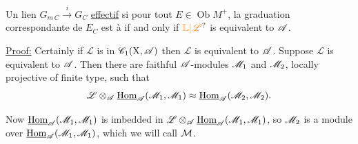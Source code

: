 Un lien $G_{m\,C}\xrightarrow{i}G_C$  \uline{effectif} si pour tout $E\in\operatorname{Ob}M^+$, la graduation correspondante de $E_C$ est à
if and only if $\unsure{\mathbb{L}|\mathscr{L}}$ is equivalent to $\mathscr{A}$.

\uline{Proof:} Certainly if $\mathscr{L}$ is in $\mathscr{C}_1(\mathrm{X},\mathscr{A})$ then $\mathscr{L}$ is equivalent to $\mathscr{A}$. Suppose $\mathscr{L}$ is equivalent to $\mathscr{A}$. Then there are faithful $\mathscr{A}$-modules $\mathscr{M}_1$ and $\mathscr{M}_2$, locally projective of finite type, such that
\[
\mathscr{L}\otimes_{\mathscr{A}}\underline{\mathrm{Hom}}_{\mathscr{A}}(\mathscr{M}_1,\mathscr{M}_1)\approx \underline{\mathrm{Hom}}_{\mathscr{A}}(\mathscr{M}_2,\mathscr{M}_2).
\]

Now $\underline{\mathrm{Hom}}_{\mathscr{A}}(\mathscr{M}_1,\mathscr{M}_1)$ is imbedded in $\mathscr{L}\otimes_{\mathscr{A}}\underline{\mathrm{Hom}}_{\mathscr{A}}(\mathscr{M}_1,\mathscr{M}_1)$, so $\mathscr{M}_2$ is a module over $\underline{\mathrm{Hom}}_{\mathscr{A}}(\mathscr{M}_1,\mathscr{M}_1)$, which we will call $\mathcal{M}$.

